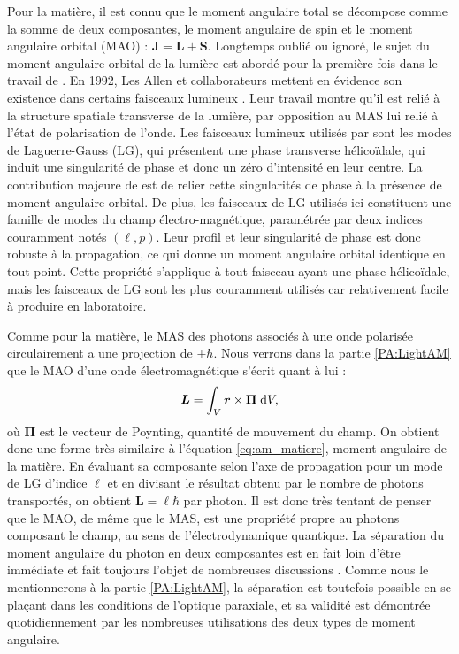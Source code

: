 Pour la matière, il est connu que le moment angulaire total se décompose comme la somme de deux composantes, le moment angulaire de spin et le moment angulaire orbital (MAO) : $\bm{J} = \bm{L}+\bm{S}$. Longtemps oublié ou ignoré, le sujet du moment angulaire orbital de la lumière est abordé pour la première fois dans le travail de . En 1992, Les Allen et collaborateurs mettent en évidence son existence dans certains faisceaux lumineux . Leur travail montre qu'il est relié à la structure spatiale transverse de la lumière, par opposition au MAS lui relié à l'état de polarisation de l'onde. Les faisceaux lumineux utilisés par  sont les modes de Laguerre-Gauss (LG), qui présentent une phase transverse hélicoïdale, qui induit une singularité de phase et donc un zéro d'intensité en leur centre. La contribution majeure de  est de relier cette singularités de phase à la présence de moment angulaire orbital. De plus, les faisceaux de LG utilisés ici constituent une famille de modes du champ électro-magnétique, paramétrée par deux indices couramment notés $(\ell,p)$. Leur profil et leur singularité de phase est donc robuste à la propagation, ce qui donne un moment angulaire orbital identique en tout point. Cette propriété s'applique à tout faisceau ayant une phase hélicoïdale, mais les faisceaux de LG sont les plus couramment utilisés car relativement facile à produire en laboratoire. 

Comme pour la matière, le MAS des photons associés à une onde polarisée circulairement a une projection de $\pm \hbar$. Nous verrons dans la partie \ref{PA:LightAM} que le MAO d'une onde électromagnétique s'écrit quant à lui :
\begin{equation}
\bm{L} = \int_V \bm{r}\times\bm{\Pi}\;\mathrm{d} V,
\end{equation}
où $\bm{\Pi}$ est le vecteur de Poynting, quantité de mouvement du champ. On obtient donc une forme très similaire à l'équation \ref{eq:am_matiere}, moment angulaire de la matière. En évaluant sa composante selon l'axe de propagation pour un mode de LG d'indice $\ell$ et en divisant le résultat obtenu par le nombre de photons transportés, on obtient $\bm{L}=\ell\hbar$ par photon. Il est donc très tentant de penser que le MAO, de même que le MAS, est une propriété propre au photons composant le champ, au sens de l'électrodynamique quantique. La séparation du moment angulaire du photon en deux composantes est en fait loin d'être immédiate  et fait toujours l'objet de nombreuses discussions . Comme nous le mentionnerons à la partie \ref{PA:LightAM}, la séparation est toutefois possible en se plaçant dans les conditions de l'optique paraxiale, et sa validité est démontrée quotidiennement par les nombreuses utilisations des deux types de moment angulaire.

